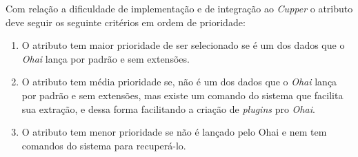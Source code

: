 Com relação a dificuldade de implementação e de integração ao \textit{Cupper} o
atributo deve seguir os seguinte critérios em ordem de prioridade:

\begin{enumerate}
\item O atributo tem maior prioridade de ser selecionado se é um dos dados 
que o \textit{Ohai} lança por padrão e sem extensões.
\item O atributo tem média prioridade se, não é um dos dados que o \textit{Ohai}
lança por padrão e sem extensões, mas existe um comando do sistema que facilita 
sua extração, e dessa forma facilitando a criação de \textit{plugins} pro 
\textit{Ohai}.
\item O atributo tem menor prioridade se não é lançado pelo Ohai e nem tem 
comandos do sistema para recuperá-lo.
\end{enumerate}

